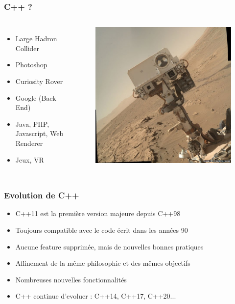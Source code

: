 \documentclass[xetex,mathserif]{beamer}
\begin{document}
\begin{frame}
\frametitle{C++ ?}
\begin{columns}[T]
 \begin{itemize}
	 \item Large Hadron Collider
	 \item Photoshop
	 \item Curiosity Rover
	 \item Google (Back End)
	 \item Java, PHP, Javascript, Web Renderer
	 \item Jeux, VR
\end{itemize}
\begin{figure}
	\includegraphics[width=1\textwidth]{curiosity.jpg}
\end{figure}
\end{columns}
\end{frame}

\begin{frame}
\frametitle{Evolution de C++}
\begin{itemize}
	 \item C++11 est la première version majeure depuis C++98
	 \item Toujours compatible avec le code écrit dans les années 90
	 \item Aucune feature supprimée, mais de nouvelles bonnes pratiques
	 \item Affinement de la même philosophie et des mêmes objectifs
	 \item Nombreuses nouvelles fonctionnalités
	 \item C++ continue d'evoluer : C++14, C++17, C++20...
\end{itemize}
\end{frame}
\end{document}
